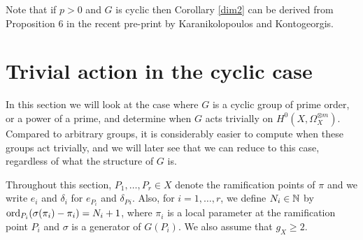     \begin{rem}
    Note that if $p>0$ and $G$ is cyclic then Corollary \ref{dim2} can be derived from Proposition $6$ in the recent pre-print
    \cite{kako} by Karanikolopoulos and Kontogeorgis.
    \end{rem}



\section{Trivial action in the cyclic case}

In this section we will look at the case where $G$ is a cyclic group of prime order, or a power of a prime, and determine when $G$ acts trivially on $H^0(X,\Omega_X^{\otimes m})$.
Compared to arbitrary groups, it is considerably easier to compute when these groups act trivially, and we will later see that we can reduce to this case, regardless of what the structure of $G$ is.


Throughout this section, $P_1,\ldots ,P_r \in X$ denote the ramification points of $\pi$ and we write $e_i$ and $\delta_i$ for $e_{P_i}$ and $\delta_P{_i}$.
Also, for $i=1, \ldots, r$, we define $N_i \in {\mathbb N}$ by $\operatorname{ord}_{P_i}(\sigma(\pi_i) - \pi_i) = N_i +1$, where $\pi_i$ is a local parameter at the ramification point $P_i$ and $\sigma$ is a generator of $G(P_i)$. 
We also assume that $g_X \geq 2$.


